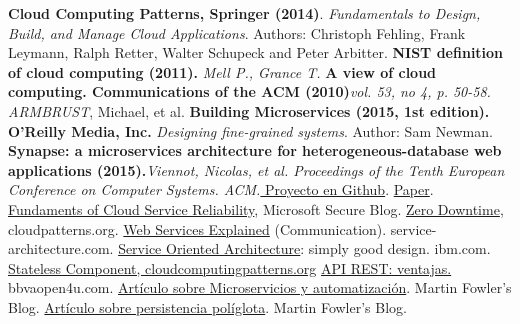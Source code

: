 \begin{thebibliography}{1}
\textbf{Cloud Computing Patterns, Springer (2014)}. \textit{Fundamentals to Design, Build, and Manage Cloud Applications}. Authors: Christoph Fehling, Frank Leymann, Ralph Retter, Walter Schupeck and Peter Arbitter.
\textbf{NIST definition of cloud computing (2011).} \textit{Mell P., Grance T.}
\textbf{A view of cloud computing. Communications of the ACM (2010)}\textit{vol. 53, no 4, p. 50-58. ARMBRUST}, Michael, et al.
\textbf{Building Microservices (2015, 1st edition). O'Reilly Media, Inc.} \textit{Designing fine-grained systems}. Author: Sam Newman.
\textbf{Synapse: a microservices architecture for heterogeneous-database web applications (2015).}\textit{Viennot, Nicolas, et al. Proceedings of the Tenth European Conference on Computer Systems. ACM.}\href{https://github.com/nviennot/synapse}{ Proyecto en Github}. \href{http://viennot.com/synapse.pdf}{Paper}.
\href{https://blogs.microsoft.com/microsoftsecure/2012/09/12/fundamentals-of-cloud-service-reliability/}{Fundaments of Cloud Service Reliability}, Microsoft Secure Blog.
\href{http://cloudpatterns.org/design_patterns/zero_downtime}{Zero Downtime}, cloudpatterns.org.
\href{http://www.service-architecture.com/articles/web-services/web_services_explained.html}{Web Services Explained} (Communication). service-architecture.com.
\href{https://www-01.ibm.com/software/solutions/soa/}{Service Oriented Architecture}: simply good design. ibm.com.
\href{http://www.cloudcomputingpatterns.org/stateless_component/}{Stateless Component, cloudcomputingpatterns.org}
\href{https://bbvaopen4u.com/es/actualidad/api-rest-que-es-y-cuales-son-sus-ventajas-en-el-desarrollo-de-proyectos}{API REST: ventajas.}  bbvaopen4u.com.
\href{https://martinfowler.com/articles/microservices.html}{Artículo sobre Microservicios y automatización}. Martin Fowler's Blog.
\href{https://martinfowler.com/bliki/PolyglotPersistence.html#footnote-first-use}{Artículo sobre persistencia políglota}. Martin Fowler's Blog.
\end{thebibliography}

